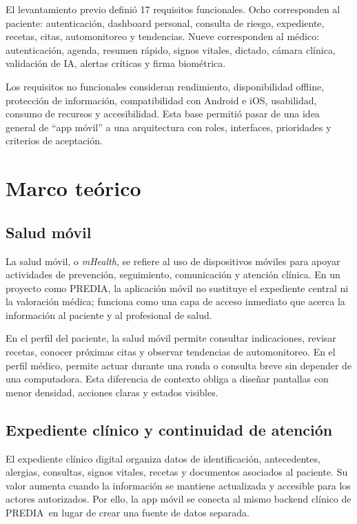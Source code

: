 \documentclass[12pt,letterpaper]{report}
\newcommand{\projectname}{PREDIA}
\begin{document}
El levantamiento previo definió 17 requisitos funcionales. Ocho corresponden al paciente: autenticación, dashboard personal, consulta de riesgo, expediente, recetas, citas, automonitoreo y tendencias. Nueve corresponden al médico: autenticación, agenda, resumen rápido, signos vitales, dictado, cámara clínica, validación de IA, alertas críticas y firma biométrica.

Los requisitos no funcionales consideran rendimiento, disponibilidad offline, protección de información, compatibilidad con Android e iOS, usabilidad, consumo de recursos y accesibilidad. Esta base permitió pasar de una idea general de ``app móvil'' a una arquitectura con roles, interfaces, prioridades y criterios de aceptación.

\chapter{Marco teórico}

\section{Salud móvil}

La salud móvil, o \textit{mHealth}, se refiere al uso de dispositivos móviles para apoyar actividades de prevención, seguimiento, comunicación y atención clínica. En un proyecto como \projectname, la aplicación móvil no sustituye el expediente central ni la valoración médica; funciona como una capa de acceso inmediato que acerca la información al paciente y al profesional de salud.

En el perfil del paciente, la salud móvil permite consultar indicaciones, revisar recetas, conocer próximas citas y observar tendencias de automonitoreo. En el perfil médico, permite actuar durante una ronda o consulta breve sin depender de una computadora. Esta diferencia de contexto obliga a diseñar pantallas con menor densidad, acciones claras y estados visibles.

\section{Expediente clínico y continuidad de atención}

El expediente clínico digital organiza datos de identificación, antecedentes, alergias, consultas, signos vitales, recetas y documentos asociados al paciente. Su valor aumenta cuando la información se mantiene actualizada y accesible para los actores autorizados. Por ello, la app móvil se conecta al mismo backend clínico de \projectname\ en lugar de crear una fuente de datos separada.
\end{document}
